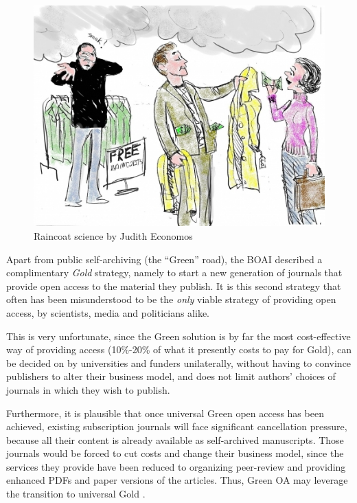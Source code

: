 \documentclass[11pt, openany, oneside, article, a4paper, twocolumn]{memoir}
\begin{document}
\begin{figure}
  \includegraphics[width=\columnwidth]{rain4.jpg}
  \caption{Raincoat science by Judith Economos}\label{fig:raincoat_science}
\end{figure}

Apart from public self-archiving (the \enquote{Green} road), the BOAI
described a complimentary \emph{Gold} strategy, namely to start a new
generation of journals that provide open access to the material they
publish. It is this second strategy that often has been misunderstood to
be the \emph{only} viable strategy of providing open access, by
scientists, media and politicians alike.

This is very unfortunate, since the Green solution is by far the most
cost-effective way of providing access \cite{houghton2013planting}
(10\%-20\% of what it presently costs to pay for Gold), can be decided on
by universities and funders unilaterally, without having to convince
publishers to alter their business model, and does not limit authors'
choices of journals in which they wish to publish.

Furthermore, it is plausible that once universal Green open access has been
achieved, existing subscription journals will face significant cancellation
pressure, because all their content is already available as self-archived
manuscripts. Those journals would be forced to cut costs and change their
business model, since the services they provide have been reduced to organizing
peer-review and providing enhanced PDFs and paper versions of the articles.
Thus, Green OA may leverage the transition to universal Gold
\cite{harnad2007green_road}.
\end{document}
